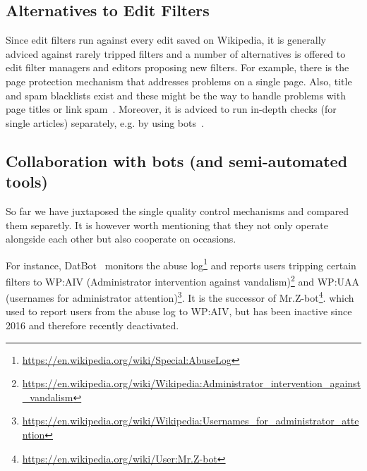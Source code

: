\subsection{Alternatives to Edit Filters}

Since edit filters run against every edit saved on Wikipedia, it is generally adviced against rarely tripped filters and a number of alternatives is offered to edit filter managers and editors proposing new filters.
For example, there is the page protection mechanism that addresses problems on a single page.
Also, title and spam blacklists exist and these might be the way to handle problems with page titles or link spam~\cite{Wikipedia:EditFilter}.
Moreover, it is adviced to run in-depth checks (for single articles) separately, e.g. by using bots~\cite{Wikipedia:EditFilterRequested}.


\subsection{Collaboration with bots (and semi-automated tools)}

So far we have juxtaposed the single quality control mechanisms and compared them separetly.
It is however worth mentioning that they not only operate alongside each other but also cooperate on occasions.

For instance, DatBot~\cite{Wikipedia:DatBot} monitors the abuse log\footnote{\url{https://en.wikipedia.org/wiki/Special:AbuseLog}}
and reports users tripping certain filters to WP:AIV (Administrator intervention against vandalism)\footnote{\url{https://en.wikipedia.org/wiki/Wikipedia:Administrator_intervention_against_vandalism}} and WP:UAA (usernames for administrator attention)\footnote{\url{https://en.wikipedia.org/wiki/Wikipedia:Usernames_for_administrator_attention}}.
It is the successor of Mr.Z-bot\footnote{\url{https://en.wikipedia.org/wiki/User:Mr.Z-bot}}.
which used to report users from the abuse log to WP:AIV, but has been inactive since 2016 and therefore recently deactivated.

